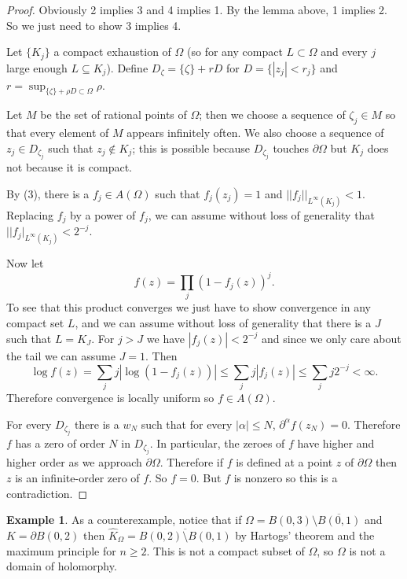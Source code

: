 \documentclass[12pt]{report}
\theoremstyle{definition}
\newtheorem{example}[theorem]{Example}
\begin{document}
\begin{proof}
    Obviously 2 implies 3 and 4 implies 1. By the lemma above, 1 implies 2. So we just need to show 3 implies 4.

    Let $\{K_j\}$ a compact exhaustion of $\Omega$ (so for any compact $L \subset \Omega$ and every $j$ large enough $L \subseteq K_j$). Define $D_\zeta = \{\zeta\} + rD$ for $D = \{|z_j| < r_j\}$ and $r = \sup_{\{\zeta\} + \rho D \subset \Omega} \rho$.

    Let $M$ be the set of rational points of $\Omega$; then we choose a sequence of $\zeta_j \in M$ so that every element of $M$ appears infinitely often. We also choose a sequence of $z_j \in D_{\zeta_j}$ such that $z_j \notin K_j$; this is possible because $D_{\zeta_j}$ touches $\partial \Omega$ but $K_j$ does not because it is compact.

    By (3), there is a $f_j \in A(\Omega)$ such that $f_j(z_j) = 1$ and $||f_j||_{L^\infty(K_j)} < 1$. Replacing $f_j$ by a power of $f_j$, we can assume without loss of generality that $||f_j|_{L^\infty(K_j)} < 2^{-j}$.

    Now let
    $$f(z) = \prod_j (1 - f_j(z))^j.$$
    To see that this product converges we just have to show convergence in any compact set $L$, and we can assume without loss of generality that there is a $J$ such that $L = K_J$. For $j > J$ we have $|f_j(z)| < 2^{-j}$ and since we only care about the tail we can assume $J = 1$. Then
    $$\log f(z) = \sum_j j|\log(1-f_j(z))| \leq \sum_j j |f_j(z)| \leq \sum_j j2^{-j} < \infty.$$
    Therefore convergence is locally uniform so $f \in A(\Omega)$.

    For every $D_{\zeta_j}$ there is a $w_N$ such that for every $|\alpha| \leq N$, $\partial^\alpha f(z_N) = 0$. Therefore $f$ has a zero of order $N$ in $D_{\zeta_j}$. In particular, the zeroes of $f$ have higher and higher order as we approach $\partial \Omega$. Therefore if $f$ is defined at a point $z$ of $\partial \Omega$ then $z$ is an infinite-order zero of $f$. So $f = 0$. But $f$ is nonzero so this is a contradiction.
\end{proof}
\begin{example}
    As a counterexample, notice that if $\Omega = B(0, 3) \setminus \overline{B(0, 1)}$ and $K = \partial B(0, 2)$ then $\hat K_\Omega = \overline{B(0, 2) \setminus B(0, 1)}$ by Hartogs' theorem and the maximum principle for $n \geq 2$. This is not a compact subset of $\Omega$, so $\Omega$ is not a domain of holomorphy.
\end{example}
\end{document}
